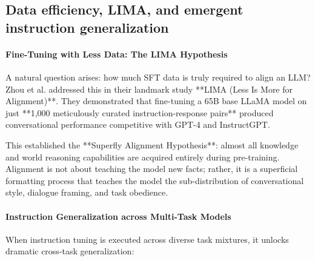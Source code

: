 \documentclass[../../../main.tex]{subfiles}
\begin{document}
\subsection{Data efficiency, LIMA, and emergent instruction generalization}
\label{subsec:data_efficiency_emergence_t0_flan}

\paragraph{Fine-Tuning with Less Data: The LIMA Hypothesis}
A natural question arises: how much SFT data is truly required to align an LLM? Zhou et al. \citep{zhou2024lima} addressed this in their landmark study **LIMA (Less Is More for Alignment)**. They demonstrated that fine-tuning a 65B base LLaMA model on just **1,000 meticulously curated instruction-response pairs** produced conversational performance competitive with GPT-4 and InstructGPT.

This established the **Superfly Alignment Hypothesis**: almost all knowledge and world reasoning capabilities are acquired entirely during pre-training. Alignment is not about teaching the model new facts; rather, it is a superficial formatting process that teaches the model the sub-distribution of conversational style, dialogue framing, and task obedience.

\paragraph{Instruction Generalization across Multi-Task Models}
When instruction tuning is executed across diverse task mixtures, it unlocks dramatic cross-task generalization:
\end{document}
